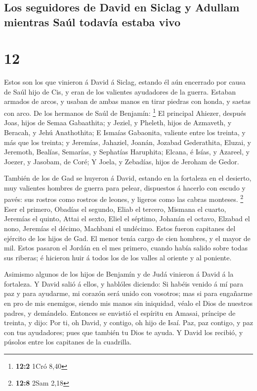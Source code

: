 \hypertarget{los-seguidores-de-david-en-siclag-y-adullam-mientras-sauxfal-todavuxeda-estaba-vivo}{%
\subsection{Los seguidores de David en Siclag y Adullam mientras Saúl
todavía estaba
vivo}\label{los-seguidores-de-david-en-siclag-y-adullam-mientras-sauxfal-todavuxeda-estaba-vivo}}

\hypertarget{section-11}{%
\section{12}\label{section-11}}

 Estos son los que vinieron á David á Siclag, estando él aún
encerrado por causa de Saúl hijo de Cis, y eran de los valientes
ayudadores de la guerra.  Estaban armados de arcos, y usaban
de ambas manos en tirar piedras con honda, y saetas con arco. De los
hermanos de Saúl de Benjamín: \footnote{\textbf{12:2} 1Cró 8,40}
 El principal Ahiezer, después Joas, hijos de Semaa
Gabaathita; y Jeziel, y Pheleth, hijos de Azmaveth, y Beracah, y Jehú
Anathothita;  E Ismaías Gabaonita, valiente entre los
treinta, y más que los treinta; y Jeremías, Jahaziel, Joanán, Jozabad
Gederathita,  Eluzai, y Jeremoth, Bealías, Semarías, y
Sephatías Haruphita;  Elcana, é Isías, y Azareel, y Joezer,
y Jasobam, de Coré;  Y Joela, y Zebadías, hijos de Jeroham
de Gedor.

 También de los de Gad se huyeron á David, estando en la
fortaleza en el desierto, muy valientes hombres de guerra para pelear,
dispuestos á hacerlo con escudo y pavés: sus rostros como rostros de
leones, y ligeros como las cabras monteses. \footnote{\textbf{12:8} 2Sam
  2,18}  Eser el primero, Obadías el segundo, Eliab el
tercero,  Mismana el cuarto, Jeremías el quinto,
 Attai el sexto, Eliel el séptimo,  Johanán el
octavo, Elzabad el nono,  Jeremías el décimo, Machbani el
undécimo.  Estos fueron capitanes del ejército de los hijos
de Gad. El menor tenía cargo de cien hombres, y el mayor de mil.
 Estos pasaron el Jordán en el mes primero, cuando había
salido sobre todas sus riberas; é hicieron huir á todos los de los
valles al oriente y al poniente.

 Asimismo algunos de los hijos de Benjamín y de Judá
vinieron á David á la fortaleza.  Y David salió á ellos, y
hablóles diciendo: Si habéis venido á mí para paz y para ayudarme, mi
corazón será unido con vosotros; mas si para engañarme en pro de mis
enemigos, siendo mis manos sin iniquidad, véalo el Dios de nuestros
padres, y demándelo.  Entonces se envistió el espíritu en
Amasai, príncipe de treinta, y dijo: Por ti, oh David, y contigo, oh
hijo de Isaí. Paz, paz contigo, y paz con tus ayudadores; pues que
también tu Dios te ayuda. Y David los recibió, y púsolos entre los
capitanes de la cuadrilla.

